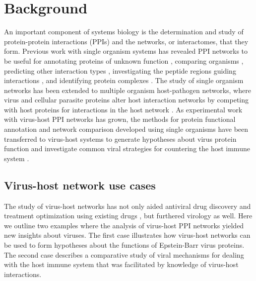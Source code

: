 \section{Background}

An important component of systems biology is the determination and
study of protein-protein interactions (PPIs) and the networks, or
interactomes, that they form. Previous work with single organism
systems has revealed PPI networks to be useful for annotating proteins
of unknown function \cite{karaoz2004whole,sharan2007network},
comparing organisms
\cite{kelley2003conserved,sharan2005conserved,dutkowski2007identification},
predicting other interaction types \cite{wong2004combining},
investigating the peptide regions guiding interactions
\cite{dinkel07,neduva06nuc,liu2010modular}, and identifying protein
complexes \cite{krogan2006global}. The study of single organism
networks has been extended to multiple organism host-pathogen
networks, where virus and cellular parasite proteins alter host
interaction networks by competing with host proteins for interactions
in the host network \cite{tournier06,sodhi04,dampier07}. As
experimental work with virus-host PPI networks has grown, the methods
for protein functional annotation and network comparison developed
using single organisms have been transferred to virus-host systems to
generate hypotheses about virus protein function \cite{calderwood07}
and investigate common viral strategies for countering the host immune
system \cite{navratil-system}.

\subsection{Virus-host network use cases}

The study of virus-host networks has not only aided antiviral drug
discovery and treatment optimization using existing drugs
\cite{brass08}, but furthered virology as well. Here we outline two
examples where the analysis of virus-host PPI networks yielded new
insights about viruses. The first case illustrates how virus-host
networks can be used to form hypotheses about the functions of
Epstein-Barr virus proteins. The second case describes a comparative
study of viral mechanisms for dealing with the host immune system that
was facilitated by knowledge of virus-host interactions.

